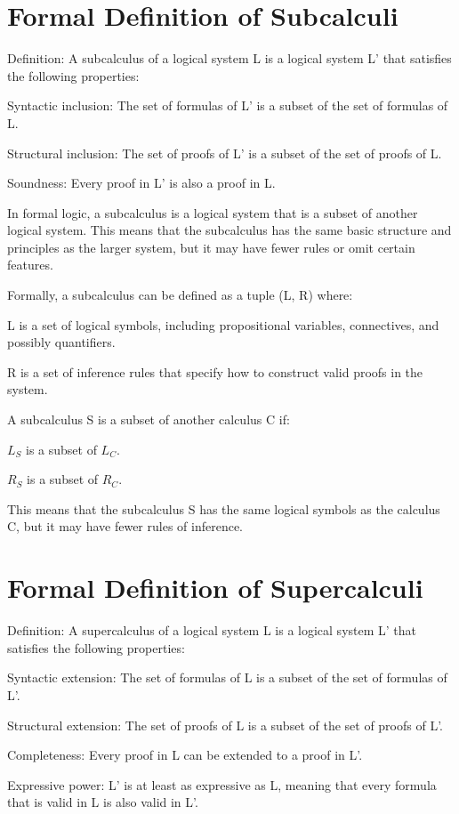 \section{Formal Definition of Subcalculi}
Definition: A subcalculus of a logical system L is a logical system L' that satisfies the following properties:

Syntactic inclusion: The set of formulas of L' is a subset of the set of formulas of L.

Structural inclusion: The set of proofs of L' is a subset of the set of proofs of L.

Soundness: Every proof in L' is also a proof in L.


In formal logic, a subcalculus is a logical system that is a subset of another logical system. This means that the subcalculus has the same basic structure and principles as the larger system, but it may have fewer rules or omit certain features.

Formally, a subcalculus can be defined as a tuple (L, R) where:

L is a set of logical symbols, including propositional variables, connectives, and possibly quantifiers.

R is a set of inference rules that specify how to construct valid proofs in the system.

A subcalculus S is a subset of another calculus C if:

$ L_S $ is a subset of $ L_C $.

$ R_S $ is a subset of $ R_C $.

This means that the subcalculus S has the same logical symbols as the calculus C, but it may have fewer rules of inference.

\section{Formal Definition of Supercalculi}
Definition: A supercalculus of a logical system L is a logical system L' that satisfies the following properties:

Syntactic extension: The set of formulas of L is a subset of the set of formulas of L'.

Structural extension: The set of proofs of L is a subset of the set of proofs of L'.

Completeness: Every proof in L can be extended to a proof in L'.

Expressive power: L' is at least as expressive as L, meaning that every formula that is valid in L is also valid in L'.

